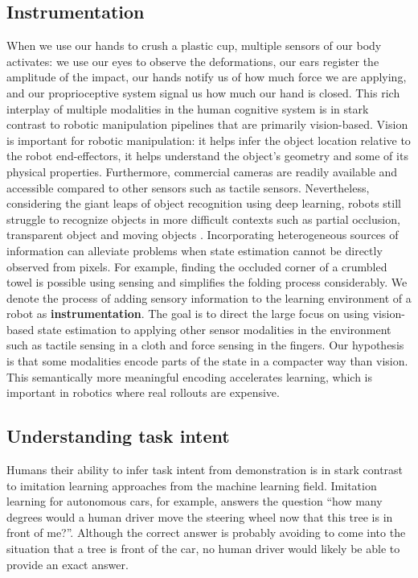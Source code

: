 \documentclass[\home/main.tex]{subfiles}
\begin{document}
\subsection{Instrumentation}
When we use our hands to crush a plastic cup, multiple sensors of our body activates: we use our eyes to observe the deformations, our ears register the amplitude of the impact, our hands notify us of how much force we are applying, and our proprioceptive system signal us how much our hand is closed. This rich interplay of multiple modalities in the human cognitive system is in stark contrast to robotic manipulation pipelines that are primarily vision-based. Vision is important for robotic manipulation: it helps infer the object location relative to the robot end-effectors, it helps understand the object's geometry and some of its physical properties. Furthermore, commercial cameras are readily available and accessible compared to other sensors such as tactile sensors. Nevertheless, considering the giant leaps of object recognition using deep learning, robots still struggle to recognize objects in more difficult contexts such as partial occlusion, transparent object and moving objects \autocite{Guo2014,sajjan2019cleargrasp,Ojha2015}.
Incorporating heterogeneous sources of information can alleviate problems when state estimation cannot be directly observed from pixels. For example, finding the occluded corner of a crumbled towel is possible using sensing and simplifies the folding process considerably.
We denote the process of adding sensory information to the learning environment of a robot as \textbf{instrumentation}. The goal is to direct the large focus on using vision-based state estimation to applying other sensor modalities in the environment such as tactile sensing in a cloth and force sensing in the fingers. Our hypothesis is that some modalities encode parts of the state in a compacter way than vision. This semantically more meaningful encoding accelerates learning, which is important in robotics where real rollouts are expensive.

\subsection{Understanding task intent}
Humans their ability to infer task intent from demonstration is in stark contrast to imitation learning approaches from the machine learning field. Imitation learning for autonomous cars, for example, answers the question \enquote{how many degrees would a human driver move the steering wheel now that this tree is in front of me?}. Although the correct answer is probably avoiding to come into the situation that a tree is front of the car, no human driver would likely be able to provide an exact answer.
\end{document}
